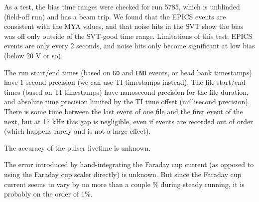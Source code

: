 \documentclass[aps,amsmath,amssymb,notitlepage,10pt,onecolumn]{revtex4-1}
\begin{document}
As a test, the bias time ranges were checked for run 5785, which is unblinded (field-off run) and has a beam trip.
We found that the EPICS events are consistent with the MYA values, and that noise hits in the SVT show the bias was off only outside of the SVT-good time range.
Limitations of this test: EPICS events are only every 2 seconds, and noise hits only become significant at low bias (below 20 V or so).

The run start/end times (based on \texttt{GO} and \texttt{END} events, or head bank timestamps) have 1 second precision (we can use TI timestamps instead).
The file start/end times (based on TI timestamps) have nanosecond precision for the file duration, and absolute time precision limited by the TI time offset (millisecond precision).
There is some time between the last event of one file and the first event of the next, but at 17 kHz this gap is negligible, even if events are recorded out of order (which happens rarely and is not a large effect).

The accuracy of the pulser livetime is unknown.

The error introduced by hand-integrating the Faraday cup current (as opposed to using the Faraday cup scaler directly) is unknown.
But since the Faraday cup current seems to vary by no more than a couple \% during steady running, it is probably on the order of 1\%.
\end{document}
